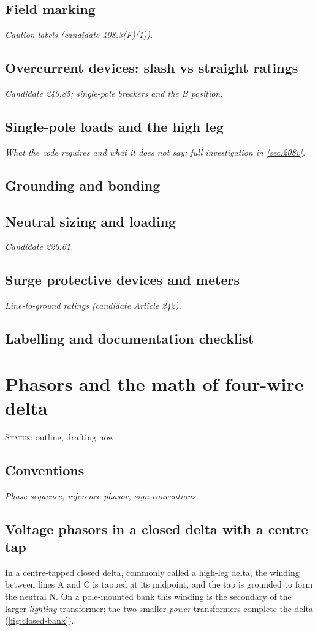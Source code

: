 \documentclass[11pt,a4paper]{article}
\newcommand{\plan}[1]{\par{\small\color{gray}\itshape #1}\par}
\newcommand{\status}[1]{{\small\color{orange!80!black}\textsc{Status:} #1}\par\medskip}
\begin{document}
\subsection{Field marking}
\plan{Caution labels (candidate 408.3(F)(1)).}
\subsection{Overcurrent devices: slash vs straight ratings}
\plan{Candidate 240.85; single-pole breakers and the B position.}
\subsection{Single-pole loads and the high leg}
\plan{What the code requires and what it does not say; full investigation in \cref{sec:208v}.}
\subsection{Grounding and bonding}
\subsection{Neutral sizing and loading}
\plan{Candidate 220.61.}
\subsection{Surge protective devices and meters}
\plan{Line-to-ground ratings (candidate Article 242).}
\subsection{Labelling and documentation checklist}

\section{Phasors and the math of four-wire delta}\label{sec:phasors}
\status{outline, drafting now}

\subsection{Conventions}
\plan{Phase sequence, reference phasor, sign conventions.}

\subsection{Voltage phasors in a closed delta with a centre tap}\label{sec:voltage-phasors}
In a centre-tapped closed delta, commonly called a high-leg delta, the winding
between lines A and C is tapped at its midpoint, and the tap is grounded to form
the neutral N. On a pole-mounted bank this winding is the secondary of the
larger \emph{lighting} transformer; the two smaller \emph{power} transformers
complete the delta (\cref{fig:closed-bank}).
\end{document}
